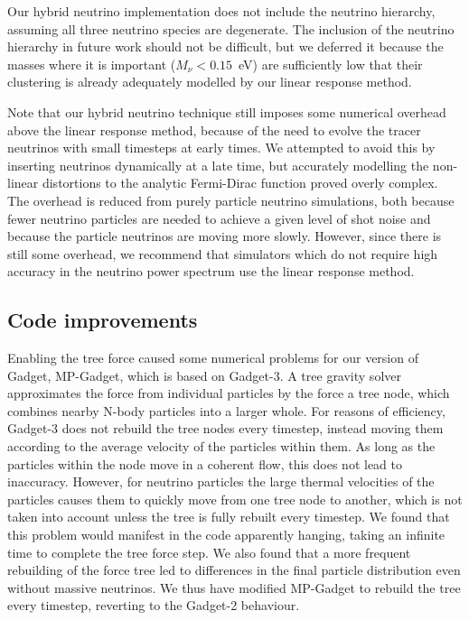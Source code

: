 \documentclass[useAMS, usenatbib]{mnras}
\begin{document}
Our hybrid neutrino implementation does not include the neutrino hierarchy, assuming all three neutrino species are degenerate. The inclusion of the neutrino hierarchy in future work should not be difficult, but we deferred it because the masses where it is important ($M_\nu < 0.15$~eV) are sufficiently low that their clustering is already adequately modelled by our linear response method.

Note that our hybrid neutrino technique still imposes some numerical overhead above the linear response method, because of the need to evolve the tracer neutrinos with small timesteps at early times. We attempted to avoid this by inserting neutrinos dynamically at a late time, but accurately modelling the non-linear distortions to the analytic Fermi-Dirac function proved overly complex. The overhead is reduced from purely particle neutrino simulations, both because fewer neutrino particles are needed to achieve a given level of shot noise and because the particle neutrinos are moving more slowly. However, since there is still some overhead, we recommend that simulators which do not require high accuracy in the neutrino power spectrum use the linear response method.

\subsection{Code improvements}
\label{sec:code}

Enabling the tree force caused some numerical problems for our version of Gadget, MP-Gadget, which is based on Gadget-3.
A tree gravity solver approximates the force from individual particles by the force a tree node, which combines nearby N-body particles into a larger whole. For reasons of efficiency, Gadget-3 does not rebuild the tree nodes every timestep, instead moving them according to the average velocity of the particles within them. As long as the particles within the node move in a coherent flow, this does not lead to inaccuracy. However, for neutrino particles the large thermal velocities of the particles causes them to quickly move from one tree node to another, which is not taken into account unless the tree is fully rebuilt every timestep. We found that this problem would manifest in the code apparently hanging, taking an infinite time to complete the tree force step. We also found that a more frequent rebuilding of the force tree led to differences in the final particle distribution even without massive neutrinos. We thus have modified MP-Gadget to rebuild the tree every timestep, reverting to the Gadget-2 behaviour.
\end{document}
